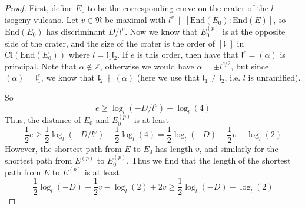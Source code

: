 \documentclass{scrartcl}
\newcommand{\N}{\mathbb{N}}
\newcommand{\Z}{\mathbb{Z}}
\newcommand{\End}{\mathrm{End}}
\newcommand{\divides}{\ \mid \ }
\newcommand{\notdivides}{\ \nmid \ }
\newcommand{\Cl}{\mathrm{Cl}}
\renewcommand{\l}{\mathfrak{l}}
\renewcommand{\N}{\mathfrak{N}}
\theoremstyle{definition}
\begin{document}
\begin{proof}
    First, define $E_0$ to be the corresponding curve on the crater of the $l$-isogeny vulcano.
    Let $v \in \N$ be maximal with $l^v \divides [\End(E_0) : \End(E)]$, so $\End(E_0)$ has discriminant $D/l^v$.
    Now we know that $E_0^{(p)}$ is at the opposite side of the crater, and the size of the crater is the order of $[\l_1]$ in $\Cl(\End(E_0))$ where $l = \l_1\l_2$.
    If $e$ is this order, then have that $\l^e = (\alpha)$ is principal.
    Note that $\alpha \notin \Z$, otherwise we would have $\alpha = \pm l^{e/2}$, but since $(\alpha) = \l_1^e$, we know that $\l_2 \notdivides (\alpha)$ (here we use that $\l_1 \neq \l_2$, i.e. $l$ is unramified).

    So
    \begin{equation*}
        e \geq \log_l(-D/l^v) - \log_l(4)
    \end{equation*}
    Thus, the distance of $E_0$ and $E_0^{(p)}$ is at least
    \begin{equation*}
        \frac 1 2 e \geq \frac 1 2 \log_l(-D/l^v) - \frac 1 2 \log_l(4) = \frac 1 2 \log_l(-D) - \frac 1 2 v - \log_l(2)
    \end{equation*}
    However, the shortest path from $E$ to $E_0$ has length $v$, and similarly for the shortest path from $E^{(p)}$ to $E_0^{(p)}$.
    Thus we find that the length of the shortest path from $E$ to $E^{(p)}$ is at least
    \begin{equation*}
        \frac 1 2 \log_l(-D) - \frac 1 2 v - \log_l(2) + 2v \geq \frac 1 2 \log_l(-D) - \log_l(2)
    \end{equation*}
\end{proof}
\end{document}
